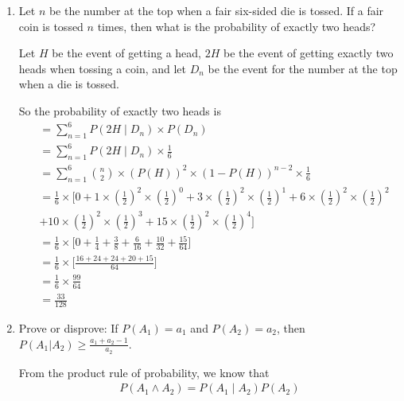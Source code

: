 \begin{enumerate}
\item \relax[3 points] Let $n$ be the number at the top when a fair
  six-sided die is tossed. If a fair coin is tossed $n$ times, then
  what is the probability of exactly two heads?

Let $H$ be the event of getting a head, $2H$ be the event of getting exactly two heads when tossing a coin, and let $D_n$ be the event for the number at the top when a die is tossed.

So the probability of exactly two heads is
\begin{equation*}
\begin{aligned}
&= \sum_{n=1}^6  P(2H \mid D_n) \times P(D_n)\\
&= \sum_{n=1}^6  P(2H \mid D_n) \times \frac{1}{6}\\
&= \sum_{n=1}^6  {n \choose 2} \times \left( P(H) \right ) ^ 2  \times \left(1- P(H) \right ) ^ {n-2} \times \frac{1}{6}\\
&= \frac{1}{6} \times \bigl [ 0 +  1 \times \left(\frac{1}{2} \right)^2 \times \left (\frac{1}{2}\right )^0 + 3 \times \left(\frac{1}{2} \right)^2 \times \left (\frac{1}{2}\right )^1 + 6 \times \left(\frac{1}{2} \right)^2 \times \left (\frac{1}{2}\right )^2 \\
&+10 \times \left(\frac{1}{2} \right)^2 \times \left (\frac{1}{2}\right )^3  + 15 \times \left(\frac{1}{2} \right)^2 \times \left (\frac{1}{2}\right )^4 \bigr ]\\
&= \frac{1}{6} \times \bigl [ 0 +  \frac{1}{4} + \frac{3}{8} + \frac{6}{16} + \frac{10}{32} + \frac{15}{64}\bigr ]\\
&= \frac{1}{6} \times \bigl [ \frac{16+24+ 24+20+15}{64}\bigr ]\\
&=\frac{1}{6} \times\frac{99}{64} \\
&=\frac{33}{128}
\end{aligned}   
\end{equation*}  
  
\item \relax[4 points] Prove or disprove: If $P(A_1) = a_1$ and
  $P(A_2) = a_2$, then $P(A_1 | A_2) \geq \frac{a_1 + a_2 -1}{a_2}$.
  
From the product rule of probability, we know that
\begin{equation}
\label{ProductRule}
\begin{aligned}
P(A_1 \wedge A_2) = P(A_1 \mid A_2) P(A_2)  
\end{aligned}   
\end{equation}  


\end{enumerate}
